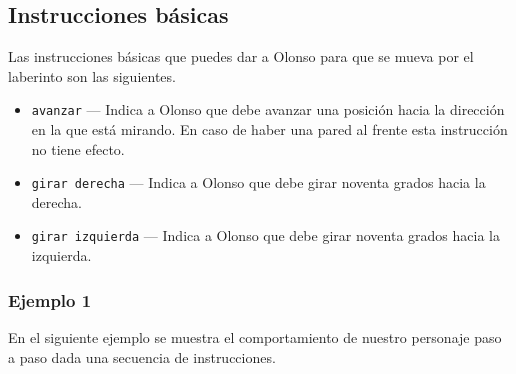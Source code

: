 \documentclass{oci}
\begin{document}
\begin{problemDescription}
\subsection*{Instrucciones básicas}
Las instrucciones básicas que puedes dar a Olonso para que se mueva por el laberinto son las siguientes.
\begin{itemize}
\item \texttt{avanzar} --- Indica a Olonso que debe avanzar una posición hacia la dirección en la que está mirando.
En caso de haber una pared al frente esta instrucción no tiene efecto.
\item \texttt{girar derecha} --- Indica a Olonso que debe girar noventa grados hacia la derecha.
\item \texttt{girar izquierda} --- Indica a Olonso que debe girar noventa grados hacia la izquierda.
\end{itemize}

\subsubsection*{Ejemplo 1}
En el siguiente ejemplo se muestra el comportamiento de nuestro personaje paso a paso dada una secuencia de instrucciones.


\end{problemDescription}
\end{document}

